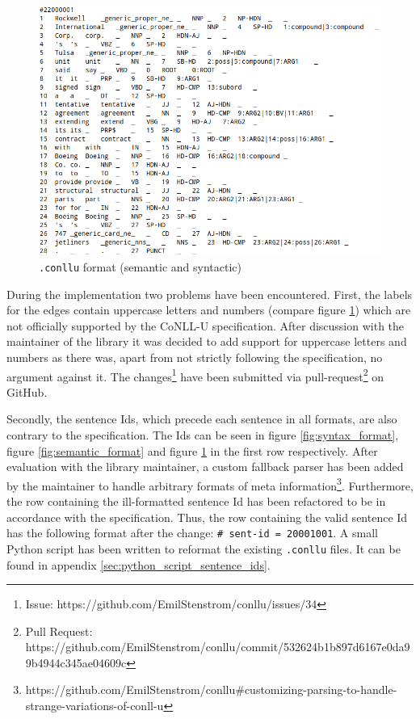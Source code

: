 \documentclass[11pt]{scrartcl}
\begin{document}
\begin{figure}[hbt]
	\center
	\includegraphics[width=1.0\textwidth]{img/conllu_format}
	\caption{\texttt{.conllu} format (semantic and syntactic)}
	\label{fig:conllu_format}
\end{figure}

During the implementation two problems have been encountered. First, the labels for the edges contain uppercase letters and numbers (compare figure \ref{fig:conllu_format}) which are not officially supported by the CoNLL-U specification. After discussion with the maintainer of the library it was decided to add support for uppercase letters and numbers as there was, apart from not strictly following the specification, no argument against it. The changes\footnote{Issue: https://github.com/EmilStenstrom/conllu/issues/34} have been submitted via pull-request\footnote{Pull Request: https://github.com/EmilStenstrom/conllu/commit/532624b1b897d6167e0da99b4944c345ae04609c} on GitHub.

Secondly, the sentence Ids, which precede each sentence in all formats, are also contrary to the specification. The Ids can be seen in figure \ref{fig:syntax_format}, figure \ref{fig:semantic_format} and figure \ref{fig:conllu_format} in the first row respectively. After evaluation with the library maintainer, a custom fallback parser has been added by the maintainer to handle arbitrary formats of meta information\footnote{https://github.com/EmilStenstrom/conllu\#customizing-parsing-to-handle-strange-variations-of-conll-u}. Furthermore, the row containing the ill-formatted sentence Id has been refactored to be in accordance with the specification. Thus, the row containing the valid sentence Id has the following format after the change: \texttt{\# sent-id = 20001001}. A small Python script has been written to reformat the existing \texttt{.conllu} files. It can be found in appendix \ref{sec:python_script_sentence_ids}.
\end{document}
